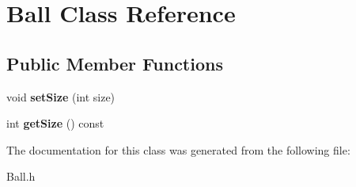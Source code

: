 \hypertarget{classBall}{}\section{Ball Class Reference}
\label{classBall}
\subsection*{Public Member Functions}
\begin{DoxyCompactItemize}
\item 
\mbox{\label{classBall_a65ad4dbec8c6cede7c11a9f3ebcf6a37}} 
void {\bfseries set\+Size} (int size)
\item 
\mbox{\label{classBall_a41550c9167d557892c83b9d0a7d07a39}} 
int {\bfseries get\+Size} () const
\end{DoxyCompactItemize}


The documentation for this class was generated from the following file\+:\begin{DoxyCompactItemize}
\item 
Ball.\+h\end{DoxyCompactItemize}
